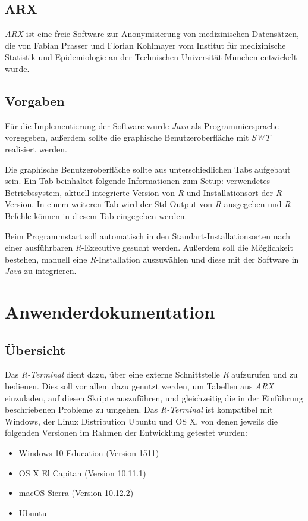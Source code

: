 \documentclass[a4paper, 12pt]{report} %
\begin{document}
\section*{ARX}
\textit{ARX} ist eine freie Software zur Anonymisierung von medizinischen Datensätzen, die von Fabian Prasser und Florian Kohlmayer vom Institut für medizinische Statistik und Epidemiologie an der Technischen Universität München entwickelt wurde. \cite{arx}


\section*{Vorgaben}

Für die Implementierung der Software wurde \textit{Java} als Programmiersprache vorgegeben, außerdem sollte die graphische Benutzeroberfläche mit \textit{SWT} realisiert werden.

Die graphische Benutzeroberfläche sollte aus unterschiedlichen Tabs aufgebaut sein. Ein Tab beinhaltet folgende Informationen zum Setup: verwendetes Betriebssystem, aktuell integrierte Version von \textit{R} und Installationsort der \textit{R}-Version. In einem weiteren Tab wird der Std-Output von \textit{R} ausgegeben und \textit{R}-Befehle können in diesem Tab eingegeben werden. 

Beim Programmstart soll automatisch in den Standart-Installationsorten nach einer ausführbaren \textit{R}-Executive gesucht werden. Außerdem soll die Möglichkeit bestehen, manuell eine \textit{R}-Installation auszuwählen und diese mit der Software in \textit{Java} zu integrieren. 


\chapter{Anwenderdokumentation}
\section{Übersicht}
Das \textit{R-Terminal} dient dazu, über eine externe Schnittstelle \textit{R} aufzurufen und zu bedienen. Dies soll vor allem dazu genutzt werden, um Tabellen aus \textit{ARX} einzuladen, auf diesen Skripte auszuführen, und gleichzeitig die in der Einführung beschriebenen Probleme zu umgehen. Das \textit{R-Terminal} ist kompatibel mit Windows, der Linux Distribution Ubuntu und OS X, von denen jeweils die folgenden Versionen im Rahmen der Entwicklung getestet wurden: 

\begin{itemize}
\item Windows 10 Education (Version 1511)
\item OS X El Capitan (Version 10.11.1)
\item macOS Sierra (Version 10.12.2)
\item Ubuntu
\end{itemize}
\end{document}
